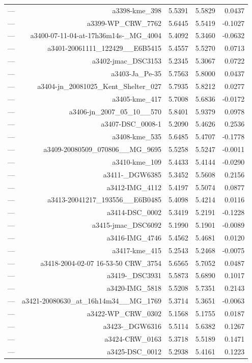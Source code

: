 \begin{table}[htbp]
\begin{tabular}{lrrrr}
— & a3398-kme_398 & 5.5391 & 5.5829 & 0.0437 \\
— & a3399-WP_CRW_7762 & 5.6445 & 5.5419 & -0.1027 \\
— & a3400-07-11-04-at-17h36m14s-_MG_4004 & 5.4092 & 5.3460 & -0.0632 \\
— & a3401-20061111_122429__E6B5415 & 5.4557 & 5.5270 & 0.0713 \\
— & a3402-jmac_DSC3153 & 5.2345 & 5.3067 & 0.0722 \\
— & a3403-Ja_Pe-35 & 5.7563 & 5.8000 & 0.0437 \\
— & a3404-jn_20081025_Kent_Shelter_027 & 5.7935 & 5.8212 & 0.0277 \\
— & a3405-kme_417 & 5.7008 & 5.6836 & -0.0172 \\
— & a3406-jn_2007_05_10__570 & 5.8401 & 5.9379 & 0.0978 \\
— & a3407-DSC_0008-1 & 5.2090 & 5.4626 & 0.2536 \\
— & a3408-kme_535 & 5.6485 & 5.4707 & -0.1778 \\
— & a3409-20080509_070806__MG_9695 & 5.5258 & 5.5247 & -0.0011 \\
— & a3410-kme_109 & 5.4433 & 5.4144 & -0.0290 \\
— & a3411-_DGW6385 & 5.3452 & 5.5608 & 0.2156 \\
— & a3412-IMG_4112 & 5.4197 & 5.5074 & 0.0877 \\
— & a3413-20041217_193556__E6B0485 & 5.4098 & 5.4214 & 0.0116 \\
— & a3414-DSC_0002 & 5.3419 & 5.2191 & -0.1228 \\
— & a3415-jmac_DSC6092 & 5.1990 & 5.1901 & -0.0089 \\
— & a3416-IMG_4746 & 5.4562 & 5.4681 & 0.0120 \\
— & a3417-kme_415 & 5.2543 & 5.2468 & -0.0075 \\
— & a3418-2004-02-07 16-53-50 CRW_3754 & 5.6565 & 5.7052 & 0.0487 \\
— & a3419-_DSC3931 & 5.5873 & 5.6890 & 0.1017 \\
— & a3420-IMG_5818 & 5.5208 & 5.7351 & 0.2143 \\
— & a3421-20080630_at_16h14m34__MG_1769 & 5.3714 & 5.3651 & -0.0063 \\
— & a3422-WP_CRW_0302 & 5.1568 & 5.1755 & 0.0187 \\
— & a3423-_DGW6316 & 5.5114 & 5.6382 & 0.1267 \\
— & a3424-CRW_0163 & 5.3718 & 5.5189 & 0.1471 \\
— & a3425-DSC_0012 & 5.2938 & 5.4161 & 0.1223 \\

\end{tabular}
\end{table}
